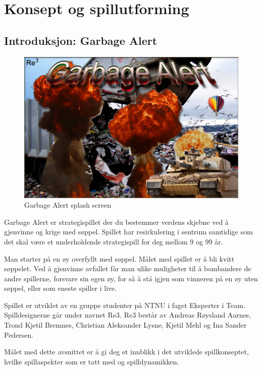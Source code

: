 \section{Konsept og spillutforming}\label{sec:konsept}

\subsection{Introduksjon: Garbage Alert}

			\begin{figure} [here]
				\begin{center}
					\includegraphics[scale=0.5]{images/splashscreen}
				\end{center}
			\caption{Garbage Alert splash screen}
		\end{figure}

Garbage Alert er strategispillet der du bestemmer verdens skjebne ved å gjenvinne og krige med søppel. Spillet har resirkulering i sentrum samtidige som det skal være et underholdende strategispill for deg mellom 9 og 99 år. 

Man starter på en øy overfyllt med søppel. Målet med spillet er å bli kvitt søppelet. Ved å gjenvinne avfallet får man ulike muligheter til å bombandere de andre spillerne, forsvare sin egen øy, for så å stå igjen som vinneren på en øy uten søppel, eller som eneste spiller i live.

Spillet er utviklet av en gruppe studenter på NTNU i faget Eksperter i Team. Spilldesignerne går under navnet Re3. Re3 består av Andreas Røysland Aarnes, Trond Kjetil Bremnes, Christian Aleksander Lysne, Kjetil Mehl og Ina Sander Pedersen.

Målet med dette avsnittet er å gi deg et innblikk i det utviklede spillkonseptet,
hvilke spillaspekter som er tatt med og spilldynamikken.


